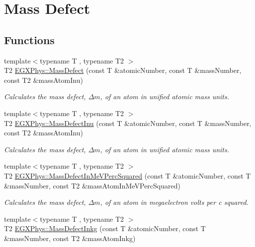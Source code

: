 \hypertarget{group___e_g_x_phys-_mass_defect}{}\section{Mass Defect}
\label{group___e_g_x_phys-_mass_defect}
\subsection*{Functions}
\begin{DoxyCompactItemize}
\item 
{\footnotesize template$<$typename T , typename T2 $>$ }\\T2 \mbox{\hyperlink{group___e_g_x_phys-_mass_defect_gae89f2dfa65992c0314adc2440b2f582a}{E\+G\+X\+Phys\+::\+Mass\+Defect}} (const T \&atomic\+Number, const T \&mass\+Number, const T2 \&mass\+Atom\+Inu)
\begin{DoxyCompactList}\small\item\em Calculates the mass defect, $\Delta m$, of an atom in unified atomic mass units. \end{DoxyCompactList}\item 
{\footnotesize template$<$typename T , typename T2 $>$ }\\T2 \mbox{\hyperlink{group___e_g_x_phys-_mass_defect_ga70400004a5cb622de372ab84670731ef}{E\+G\+X\+Phys\+::\+Mass\+Defect\+Inu}} (const T \&atomic\+Number, const T \&mass\+Number, const T2 \&mass\+Atom\+Inu)
\begin{DoxyCompactList}\small\item\em Calculates the mass defect, $\Delta m$, of an atom in unified atomic mass units. \end{DoxyCompactList}\item 
{\footnotesize template$<$typename T , typename T2 $>$ }\\T2 \mbox{\hyperlink{group___e_g_x_phys-_mass_defect_gab51169bf871d0ea0ee0642fa300228fe}{E\+G\+X\+Phys\+::\+Mass\+Defect\+In\+Me\+V\+Perc\+Squared}} (const T \&atomic\+Number, const T \&mass\+Number, const T2 \&mass\+Atom\+In\+Me\+V\+Perc\+Squared)
\begin{DoxyCompactList}\small\item\em Calculates the mass defect, $\Delta m$, of an atom in megaelectron volts per c squared. \end{DoxyCompactList}\item 
{\footnotesize template$<$typename T , typename T2 $>$ }\\T2 \mbox{\hyperlink{group___e_g_x_phys-_mass_defect_gad5378933021e13598a76bd8581b1e887}{E\+G\+X\+Phys\+::\+Mass\+Defect\+Inkg}} (const T \&atomic\+Number, const T \&mass\+Number, const T2 \&mass\+Atom\+Inkg)

\end{DoxyCompactItemize}

